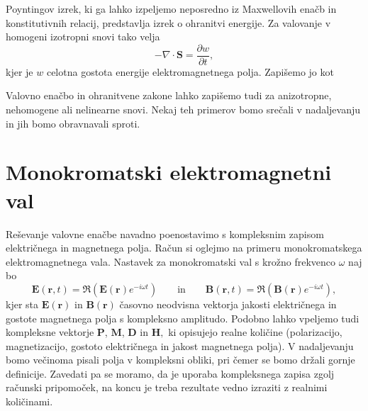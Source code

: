 Poyntingov izrek, ki ga lahko izpeljemo neposredno 
iz Maxwellovih enačb in konstitutivnih relacij, predstavlja izrek o ohranitvi 
energije. Za valovanje v homogeni izotropni snovi tako velja
\begin{equation}
-\nabla\cdot\mathbf{S}=\frac{\partial w}{\partial t},
\end{equation}
kjer je $w$ celotna
gostota energije elektromagnetnega polja. Zapišemo jo kot 

Valovno enačbo in ohranitvene zakone lahko zapišemo tudi za anizotropne,
nehomogene ali nelinearne snovi. Nekaj teh primerov bomo srečali v nadaljevanju
in jih bomo obravnavali sproti.

\section{Monokromatski elektromagnetni val}
Reševanje valovne enačbe navadno poenostavimo s kompleksnim
zapisom električnega in magnetnega polja. Račun si
oglejmo na primeru monokromatskega elektromagnetnega vala. Nastavek
za monokromatski val s krožno frekvenco $\omega$ naj bo
\begin{equation}
\mathbf{E}(\mathbf{r},t)  =\mathfrak{\Re}(\mathbf{E}(\mathbf{r})e^{-i\omega t})\qquad \textrm{in} \qquad
\mathbf{B}(\mathbf{r},t)  =\mathfrak{\Re}(\mathbf{B}(\mathbf{r})e^{-i\omega t}),
\label{eq:rval}
\end{equation}
kjer sta $\mathbf E(\mathbf{r})$ in $\mathbf B(\mathbf{r})$ časovno
neodvisna vektorja jakosti električnega in gostote
magnetnega polja s kompleksno
amplitudo. Podobno lahko vpeljemo tudi kompleksne vektorje $\mathbf{P}$,
$\mathbf{M}$, $\mathbf{D}$ in $\mathbf{H},$ ki opisujejo realne količine (polarizacijo,
magnetizacijo, gostoto električnega in jakost magnetnega polja).
V nadaljevanju bomo večinoma pisali polja v kompleksni obliki, pri
čemer se bomo držali gornje definicije. Zavedati pa se moramo, da
je uporaba kompleksnega zapisa zgolj računski pripomoček, na koncu
je treba rezultate vedno izraziti z realnimi količinami. 

